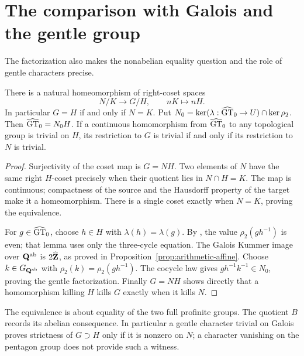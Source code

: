 \section{The comparison with Galois and the gentle group}
The factorization also makes the nonabelian equality question and the
role of gentle characters precise.

\begin{proposition}\label{prop:normalized-comparison}
There is a natural homeomorphism of right-coset spaces
\[
 N/K\longrightarrow G/H,\qquad nK\longmapsto nH.
\]
In particular $G=H$ if and only if $N=K$.
Put $N_0=\ker(\lambda:\widehat{\mathrm{GT}}_0\to U)\cap\ker\rho_2$.
Then $\widehat{\mathrm{GT}}_0=N_0H$. If a continuous homomorphism from $\widehat{\mathrm{GT}}_0$
to any topological group is trivial on $H$, its restriction to $G$
is trivial if and only if its restriction to $N$ is trivial.
\end{proposition}
\begin{proof}
Surjectivity of the coset map is $G=NH$. Two elements of $N$ have
the same right $H$-coset precisely when their quotient lies in
$N\cap H=K$. The map is continuous; compactness of the source and
the Hausdorff property of the target make it a homeomorphism.
There is a single coset exactly when $N=K$, proving the equivalence.

For $g\in\widehat{\mathrm{GT}}_0$, choose $h\in H$ with $\lambda(h)=\lambda(g)$.
By \cite[Lemma~7(c)]{H17}, the value $\rho_2(gh^{-1})$ is even;
that lemma uses only the three-cycle equation. The Galois Kummer
image over $\mathbf Q^{\mathrm{ab}}$ is $2\widehat{\mathbf Z}$, as proved in
Proposition~\ref{prop:arithmetic-affine}. Choose
$k\in G_{\mathbf Q^{\mathrm{ab}}}$ with
$\rho_2(k)=\rho_2(gh^{-1})$. The cocycle law gives
$gh^{-1}k^{-1}\in N_0$, proving the gentle factorization.
Finally $G=NH$ shows directly that a homomorphism killing $H$
kills $G$ exactly when it kills $N$.
\end{proof}

The equivalence is about equality of the two full profinite groups.
The quotient $B$ records its abelian consequence. In particular a
gentle character trivial on Galois proves strictness of $G\supset H$
only if it is nonzero on $N$; a character vanishing on the pentagon
group does not provide such a witness.
